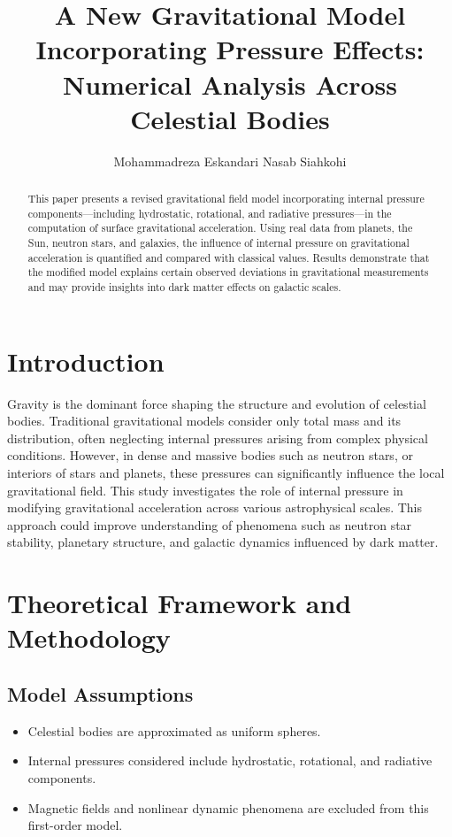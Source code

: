 \documentclass[12pt,a4paper]{article}
\title{A New Gravitational Model Incorporating Pressure Effects: Numerical Analysis Across Celestial Bodies}
\author{Mohammadreza Eskandari Nasab Siahkohi}
\date{}
\begin{document}
\maketitle

\begin{abstract}
This paper presents a revised gravitational field model incorporating internal pressure components—including hydrostatic, rotational, and radiative pressures—in the computation of surface gravitational acceleration. Using real data from planets, the Sun, neutron stars, and galaxies, the influence of internal pressure on gravitational acceleration is quantified and compared with classical values. Results demonstrate that the modified model explains certain observed deviations in gravitational measurements and may provide insights into dark matter effects on galactic scales.
\end{abstract}

\section{Introduction}
Gravity is the dominant force shaping the structure and evolution of celestial bodies. Traditional gravitational models consider only total mass and its distribution, often neglecting internal pressures arising from complex physical conditions. However, in dense and massive bodies such as neutron stars, or interiors of stars and planets, these pressures can significantly influence the local gravitational field. This study investigates the role of internal pressure in modifying gravitational acceleration across various astrophysical scales. This approach could improve understanding of phenomena such as neutron star stability, planetary structure, and galactic dynamics influenced by dark matter.

\section{Theoretical Framework and Methodology}
\subsection{Model Assumptions}
\begin{itemize}
\item Celestial bodies are approximated as uniform spheres.
\item Internal pressures considered include hydrostatic, rotational, and radiative components.
\item Magnetic fields and nonlinear dynamic phenomena are excluded from this first-order model.
\end{itemize}
\end{document}
